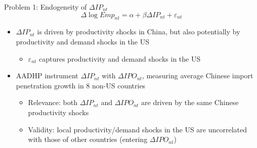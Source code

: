 \documentclass{beamer}
\begin{document}
\begin{frame}[t]{Problem 1: Endogeneity of $\Delta IP_{nt}$}
\vspace{-0.5cm}
$$\Delta\log Emp_{nt}=\alpha+\beta \Delta IP_{nt}+\varepsilon_{nt}$$

\begin{itemize}
\item $\Delta IP_{nt}$ is driven by productivity shocks in China, but also potentially by productivity and demand shocks in the US %
\smallskip
\begin{itemize}
\item $\varepsilon_{nt}$ captures productivity and demand shocks in the US %
\end{itemize}
\pause{}\bigskip
\item AADHP instrument $\Delta IP_{nt}$ with $\Delta IPO_{nt}$, measuring average Chinese import penetration growth in 8 non-US countries\smallskip\pause{}
	\begin{itemize}
	\item Relevance: both  $\Delta IP_{nt}$ and $\Delta IPO_{nt}$ are driven by the same Chinese productivity shocks
	\smallskip
	\item Validity: local productivity/demand shocks in the US are uncorrelated with those of other countries (entering $\Delta IPO_{nt}$)
	\end{itemize}
\end{itemize}
\end{frame}
\end{document}
